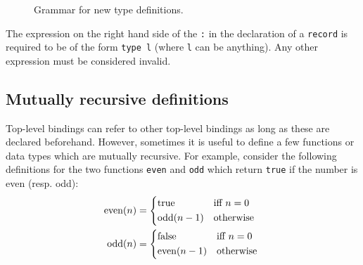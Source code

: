 \begin{figure}[H]
	\centering


	\caption{Grammar for new type definitions.}
	\label{fig:zilch-grammar-declarations-type-grammar}
\end{figure}

\begin{warningbox}
	The expression on the right hand side of the \texttt{:} in the declaration of a \texttt{record} is required to be of the form \texttt{type l} (where \texttt{l} can be anything).
	Any other expression must be considered invalid.
\end{warningbox}

\subsection{Mutually recursive definitions}\label{subsec:zilch-grammar-declarations-mutual}

Top-level bindings can refer to other top-level bindings as long as these are declared beforehand.
However, sometimes it is useful to define a few functions or data types which are mutually recursive.
For example, consider the following definitions for the two functions \texttt{even} and \texttt{odd} which return \texttt{true} if the number is even (resp. odd):
\begin{align*}
	\operatorname{even}(n) & = \begin{cases*}
		                           \mathrm{true}             & iff $n = 0$ \\
		                           \operatorname{odd}(n - 1) & otherwise
	                           \end{cases*}  \\
	\operatorname{odd}(n)  & = \begin{cases*}
		                           \mathrm{false}             & iff $n = 0$ \\
		                           \operatorname{even}(n - 1) & otherwise
	                           \end{cases*}
\end{align*}

